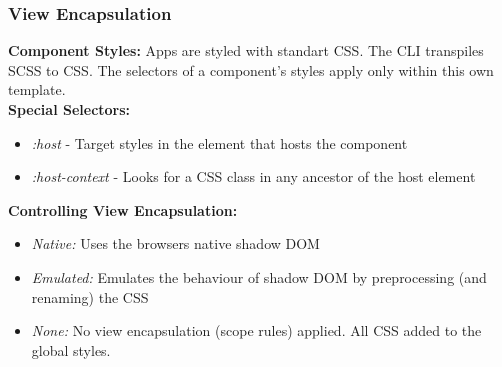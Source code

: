 \subsubsection{View Encapsulation}
\textbf{Component Styles:} Apps are styled with standart CSS.
The CLI transpiles SCSS to CSS.
The selectors of a component's styles apply only within this own template.\\
\textbf{Special Selectors:}
\begin{itemize}
    \item \textit{:host} - Target styles in the element that hosts the component
    \item \textit{:host-context} - Looks for a CSS class in any ancestor of the host element
\end{itemize}
\textbf{Controlling View Encapsulation:}
\begin{itemize}
    \item \textit{Native:} Uses the browsers native shadow DOM
    \item \textit{Emulated:} Emulates the behaviour of shadow DOM by preprocessing (and renaming) the CSS
    \item \textit{None:} No view encapsulation (scope rules) applied. All CSS added to the global styles.
\end{itemize}